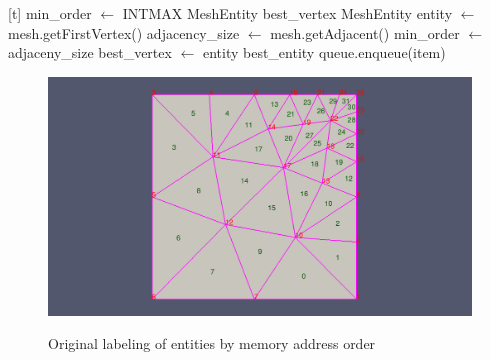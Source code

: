 \documentclass{article}
\begin{document}
\begin{algorithm}
\begin{algorithmic}

[t]
    \State{}
    \State min\_order $\gets$ INTMAX
    \State MeshEntity best\_vertex
    \State MeshEntity entity $\gets$ mesh.getFirstVertex()
            \State adjacency\_size $\gets$ mesh.getAdjacent()
                \State min\_order $\gets$ adjaceny\_size
                \State best\_vertex $\gets$ entity
            \EndIf
        \EndIf
    \EndWhile
    \State\Return best\_entity
\EndProcedure
\State
{}
            \State queue.enqueue(item)
        \EndIf
    \EndFor
\EndProcedure

\end{algorithmic}
\end{algorithm}

\FloatBarrier

\begin{figure}[ht]
\caption{Original labeling of entities by memory address order}
{\includegraphics[width = 15cm ]{pre_b}}
\centering
\end{figure}
\end{document}
